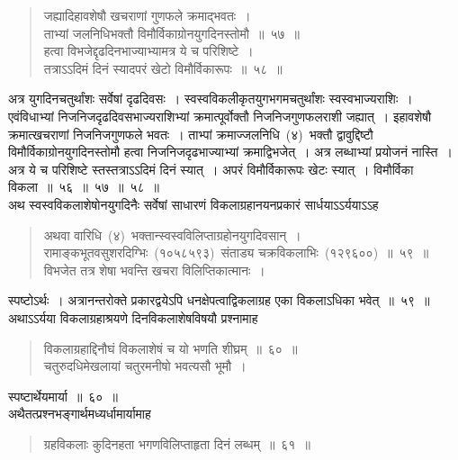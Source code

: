 \documentclass[11pt, openany]{book}
\begin{document}
\newpage
\thispagestyle{fancy}
\fancyhf{}
\begin{quote}
{\ks जह्यादिहावशेषौ खचराणां गुणफले क्रमाद्भवतः~।\\
ताभ्यां जलनिधिभक्तौ विमौर्विकाग्रोनयुगदिनस्तोमौ~॥~५७~॥\\
हत्वा विभजेद्दृढदिनभाज्याभ्यामत्र ये च परिशिष्टे~।\\
तत्राऽऽदिमं दिनं स्यादपरं खेटो विमौर्विकारूपः~॥~५८~॥}\\
\end{quote}
\indent
अत्र युगदिनचतुर्थांशः सर्वेषां दृढदिवसः~। स्वस्वविकलीकृतयुगभगमचतुर्थांशः स्वस्वभाज्यराशिः~। एवंविधाभ्यां निजनिजदृढदिवसभाज्यराशिभ्यां क्रमात्पूर्वोक्तौ निजनिजगुणफलराशी जह्यात्~। इहावशेषौ क्रमात्खचराणां निजनिजगुणफले भवतः~। ताभ्पां क्रमाज्जलनिधि~(४)~भक्तौ द्वावुद्दिष्टौ विमौर्विकाग्रोनयुगदिनस्तोमौ हत्वा निजनिजदृढभाज्याभ्यां क्रमाद्विभजेत्~। अत्र लब्धाभ्यां प्रयोजनं नास्ति~। अत्र ये च परिशिष्टे स्तस्तत्राऽऽदिमं दिनं स्यात्~। अपरं विमौर्विकारूपः खेटः स्यात्~। विमौर्विका विकला~॥~५६~॥~५७~॥~५८~॥\\
\indent
अथ स्वस्वविकलाशेषोनयुगदिनैः सर्वेषां साधारणं विकलाग्रहानयनप्रकारं सार्धयाऽऽर्ययाऽऽह\textendash
\begin{quote}
{\ks अथवा वारिधि~(४)~भक्तान्स्वस्वविलिप्ताग्रहोनयुगदिवसान्~।\\
रामाङ्कभूतवसुशरदिग्भिः~(१०५८५९३)~संताड्य चक्रविकलाभिः~(१२९६००)~॥~५९~॥\\
विभजेत तत्र शेषा भवन्ति खचरा विलिप्तिकात्मानः~।}
\end{quote}
\indent
स्पष्टोऽर्थः~। अत्रानन्तरोक्ते प्रकारद्वयेऽपि धनक्षेपत्वाद्विकलाग्रह एका विकलाऽधिका भवेत्~॥~५९~॥\\
\indent
अथाऽऽर्यया विकलाग्रहाश्रयणे दिनविकलाशेषविषयौ प्रश्नामाह\textendash
\begin{quote}
{\ks विकलाग्रहाद्दिनौघं विकलाशेषं च यो भणति शीघ्रम्~॥~६०~॥\\
चतुरुदधिमेखलायां चतुरमनीषो भवत्यसौ भूमौ~।}
\end{quote}
\indent
स्पष्टार्थेयमार्या~॥~६०~॥\\
\indent
अथैतत्प्रश्नभङ्गार्थमध्यर्धामार्यामाह\textendash
\begin{quote}
{\ks ग्रहविकलाः कुदिनहता भगणविलिप्ताहृता दिनं लब्धम्~॥~६१~॥}
\end{quote}
\end{document}
